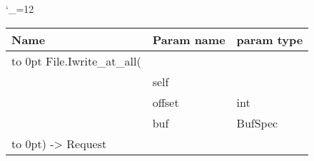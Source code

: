 \begingroup \catcode`\_=12 \tt
\begin{tabular}{lll}
\toprule
\textrm{Name}&\textrm{Param name}&\textrm{param type}\\
\midrule
\hbox to 0pt {File.Iwrite_at_all(\hss}\\
& self\\
& offset & int\\
& buf & BufSpec\\
\hbox to 0pt{) -> Request\hss}\\
\bottomrule
\end{tabular}
\endgroup
